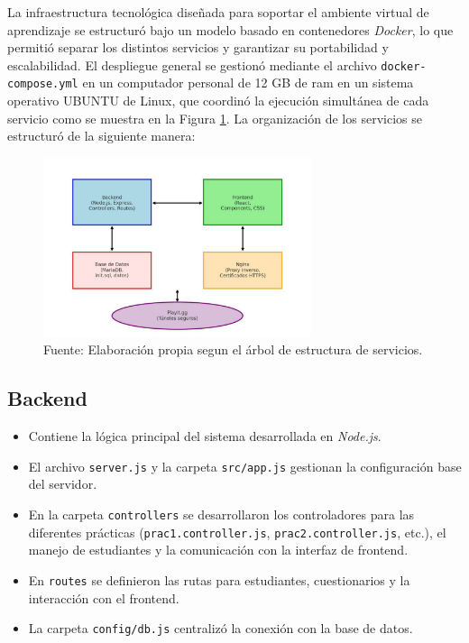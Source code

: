 \documentclass[letter,oneside,12pt,spanish]{report}
\begin{document}
La infraestructura tecnológica diseñada para soportar el ambiente virtual de aprendizaje se estructuró bajo un modelo basado en contenedores \textit{Docker}, lo que permitió separar los distintos servicios y garantizar su portabilidad y escalabilidad. El despliegue general se gestionó mediante el archivo \texttt{docker-compose.yml} en un computador personal de 12 GB de ram en un sistema operativo UBUNTU de Linux, que coordinó la ejecución simultánea de cada servicio como se muestra en la Figura \ref{fig:AVA}. La organización de los servicios se estructuró de la siguiente manera:

\begin{figure}[ht]
	\centering
	\includegraphics[width=0.7\textwidth]{Figs/Arquitectura_AVA.pdf}
	\label{fig:AVA}
	\\Fuente: Elaboración propia segun el árbol de estructura de servicios.
\end{figure}

\subsection{Backend}
\begin{itemize}
    \item Contiene la lógica principal del sistema desarrollada en \textit{Node.js}.
    \item El archivo \texttt{server.js} y la carpeta \texttt{src/app.js} gestionan la configuración base del servidor.
    \item En la carpeta \texttt{controllers} se desarrollaron los controladores para las diferentes prácticas (\texttt{prac1.controller.js}, \texttt{prac2.controller.js}, etc.), el manejo de estudiantes y la comunicación con la interfaz de frontend.
    \item En \texttt{routes} se definieron las rutas para estudiantes, cuestionarios y la interacción con el frontend.
    \item La carpeta \texttt{config/db.js} centralizó la conexión con la base de datos.
\end{itemize}
\end{document}
